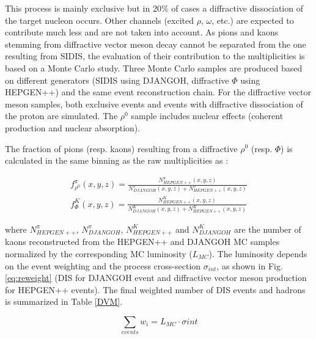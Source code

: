 This process is mainly exclusive but in 20\% of cases a diffractive dissociation of the target nucleon occurs. Other channels (excited $\rho$, $\omega$, etc.) are expected to contribute much less and are not taken into account. As pions and kaons stemming from diffractive vector meson decay cannot be separated from the one resulting from SIDIS, the evaluation of their contribution to the multiplicities is based on a Monte Carlo study. Three Monte Carlo samples are produced based on different generators (SIDIS using DJANGOH, diffractive $\Phi$ using HEPGEN++) and the same event reconstruction chain. For the diffractive vector meson samples, both exclusive events and events with diffractive dissociation of the proton are simulated. The $\rho^0$ sample includes nuclear effects (coherent production and nuclear absorption).

The fraction of pions (resp. kaons) resulting from a diffractive $\rho^0$ (resp. $\Phi$) is calculated in the same binning as the raw multiplicities as :

\begin{equation}
  \begin{split}
    f^{\pi}_{\rho^0}(x,y,z) = \frac{N^{\pi}_{HEPGEN++}(x,y,z)}{N^{\pi}_{DJANGOH}(x,y,z)+N^{\pi}_{HEPGEN++}(x,y,z)} \\
    f^K_{\Phi}(x,y,z) = \frac{N^K_{HEPGEN++}(x,y,z)}{N^K_{DJANGOH}(x,y,z)+N^K_{HEPGEN++}(x,y,z)}
  \end{split}
\end{equation}

where $N^{\pi}_{HEPGEN++}$, $N^{\pi}_{DJANGOH}$, $N^K_{HEPGEN++}$ and $N^K_{DJANGOH}$ are the number of kaons reconstructed from the HEPGEN++ and DJANGOH MC samples normalized by the corresponding MC luminosity ($L_{MC}$). The luminosity depends on the event weighting and the process cross-section $\sigma_{int}$, as shown in Fig. \ref{eq:reweight} (DIS for DJANGOH event and diffractive vector meson production for HEPGEN++ events). The final weighted number of DIS events and hadrons is summarized in Table \ref{DVM}.

\begin{equation} \label{eq:reweight}
  \sum_{events} w_i = L_{MC} \cdot \sigma{int}
\end{equation}

